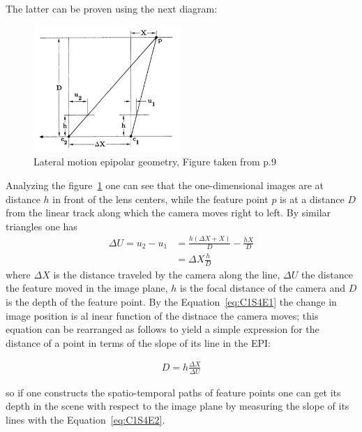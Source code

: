 The latter can be proven using the next diagram:

\begin{figure}[h!]
\centering
\includegraphics[width= 0.50\textwidth]{./Diagrams/stereo-dist.jpg}
\caption{Lateral motion epipolar geometry, Figure taken from \cite{Bolles} p.9}
\label{fig:LateralMotion}
\end{figure}

Analyzing the figure~\ref{fig:LateralMotion} one can see that the one-dimensional images are at distance $h$ in front of the lens centers, while the feature point $p$ is at a distance $D$ from the linear track along which the camera moves right to left. By similar triangles one has
\begin{equation}
\label{eq:C1S4E1}
\begin{aligned}
\Delta U = u_2-u_1 &= \frac{h(\Delta X+X)}{D}-\frac{hX}{D}\\
                   &= \Delta X\frac{h}{D}
\end{aligned}
\end{equation}
where $\Delta X$ is the distance traveled by the camera along the line, $\Delta U$ the distance the feature moved in the image plane, $h$ is the focal distance of the camera and $D$ is the depth of the feature point. By the Equation~\ref{eq:C1S4E1} the change in image position is al inear function of the distnace the camera moves; this equation can be rearranged as follows to yield a simple expression for the distance of a point in terms of the slope of its line in the EPI:

\begin{equation}
\label{eq:C1S4E2}
\begin{aligned}
D = h\frac{\Delta X}{\Delta U}
\end{aligned}
\end{equation}

so if one constructs the spatio-temporal paths of feature points one can get its depth in the scene with respect to the image plane by measuring the slope of its lines with the Equation~\ref{eq:C1S4E2}.

